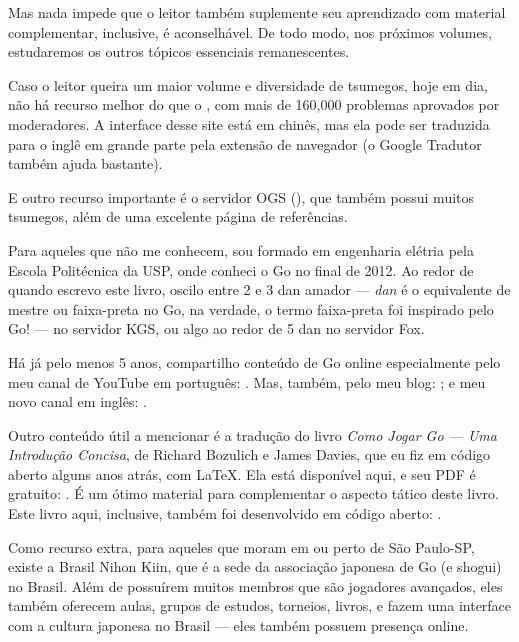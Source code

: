 Mas nada impede que o leitor também suplemente seu aprendizado com material complementar, inclusive, é aconselhável. De todo modo, nos próximos volumes, estudaremos os outros tópicos essenciais remanescentes.

Caso o leitor queira um maior volume e diversidade de tsumegos, hoje em dia, não há recurso melhor do que o , com mais de 160,000 problemas aprovados por moderadores. A interface desse site está em chinês, mas ela pode ser traduzida para o inglê em grande parte pela extensão de navegador  (o Google Tradutor também ajuda bastante).

E outro recurso importante é o servidor OGS (), que também possui muitos tsumegos, além de uma excelente página de referências.

\bigskip
\bigskip

Para aqueles que não me conhecem, sou formado em engenharia elétria pela Escola Politécnica da USP, onde conheci o Go no final de 2012. Ao redor de quando escrevo este livro, oscilo entre 2 e 3 dan amador --- \emph{dan} é o equivalente de mestre ou faixa-preta no Go, na verdade, o termo faixa-preta foi inspirado pelo Go! --- no servidor KGS, ou algo ao redor de 5 dan no servidor Fox.

Há já pelo menos 5 anos, compartilho conteúdo de Go online especialmente pelo meu canal de YouTube em português: . Mas, também, pelo meu blog: ; e meu novo canal em inglês: .

Outro conteúdo útil a mencionar é a tradução do livro \emph{Como Jogar Go --- Uma Introdução Concisa}, de Richard Bozulich e James Davies, que eu fiz em código aberto alguns anos atrás, com \LaTeX. Ela está disponível aqui, e seu PDF é gratuito: . É um ótimo material para complementar o aspecto tático deste livro. Este livro aqui, inclusive, também foi desenvolvido em código aberto: .

Como recurso extra, para aqueles que moram em ou perto de São Paulo-SP, existe a Brasil Nihon Kiin, que é a sede da associação japonesa de Go (e shogui) no Brasil. Além de possuírem muitos membros que são jogadores avançados, eles também oferecem aulas, grupos de estudos, torneios, livros, e fazem uma interface com a cultura japonesa no Brasil --- eles também possuem presença online.


